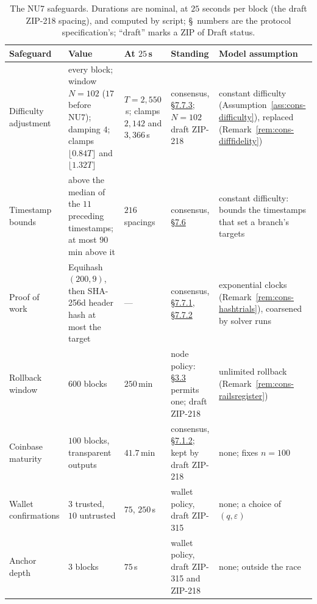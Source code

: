 \documentclass[11pt,a4paper]{article}
\theoremstyle{definition}
\begin{document}
\begin{table}[ht]
\centering
\small
\setlength{\tabcolsep}{3.5pt}
\begin{tabular}{@{}p{21mm}p{32mm}p{16mm}p{30mm}p{29mm}@{}}
\toprule
Safeguard & Value & At $25$\,s & Standing & Model assumption \\
\midrule
Difficulty adjustment
  & every block; window $N=102$ ($17$ before NU7); damping $4$; clamps
    $\lfloor0.84T\rfloor$ and $\lfloor1.32T\rfloor$
  & $T=2{,}550$\,s; clamps $2{,}142$ and $3{,}366$\,s
  & consensus,
    \href{https://zips.z.cash/protocol/protocol.pdf\#diffadjustment}{\S7.7.3};
    $N=102$ draft ZIP-218
  & constant difficulty (Assumption~\ref{ass:cons-difficulty}), replaced
    (Remark~\ref{rem:cons-difffidelity}) \\
\addlinespace[2pt]
Timestamp bounds
  & above the median of the $11$ preceding timestamps; at most $90$\,min
    above it
  & $216$ spacings
  & consensus,
    \href{https://zips.z.cash/protocol/protocol.pdf\#blockheader}{\S7.6}
  & constant difficulty: bounds the timestamps that set a branch's targets \\
\addlinespace[2pt]
Proof of work
  & Equihash $(200,9)$, then SHA-256d header hash at most the target
  & ---
  & consensus,
    \href{https://zips.z.cash/protocol/protocol.pdf\#equihash}{\S7.7.1},
    \href{https://zips.z.cash/protocol/protocol.pdf\#difficulty}{\S7.7.2}
  & exponential clocks (Remark~\ref{rem:cons-hashtrials}), coarsened by
    solver runs \\
\addlinespace[2pt]
Rollback window
  & $600$ blocks
  & $250$\,min
  & node policy:
    \href{https://zips.z.cash/protocol/protocol.pdf\#blockchain}{\S3.3}
    permits one; draft ZIP-218
  & unlimited rollback (Remark~\ref{rem:cons-railsregister}) \\
\addlinespace[2pt]
Coinbase maturity
  & $100$ blocks, transparent outputs
  & $41.7$\,min
  & consensus,
    \href{https://zips.z.cash/protocol/protocol.pdf\#txnconsensus}{\S7.1.2};
    kept by draft ZIP-218
  & none; fixes $n=100$ \\
\addlinespace[2pt]
Wallet confirmations
  & $3$ trusted, $10$ untrusted
  & $75$, $250$\,s
  & wallet policy, draft ZIP-315
  & none; a choice of $(q,\varepsilon)$ \\
\addlinespace[2pt]
Anchor depth
  & $3$ blocks
  & $75$\,s
  & wallet policy, draft ZIP-315 and ZIP-218
  & none; outside the race \\
\bottomrule
\end{tabular}
\caption{The NU7 safeguards. Durations are nominal, at $25$ seconds per
block (the draft ZIP-218 spacing), and computed by script; \S\ numbers are
the protocol specification's; ``draft'' marks a ZIP of Draft status.}
\label{tab:cons-safeguards}
\end{table}
\end{document}
